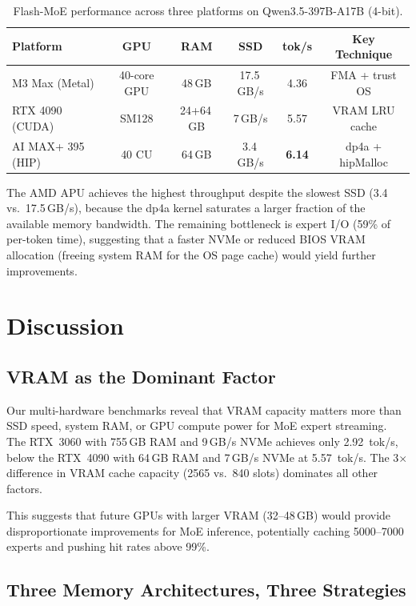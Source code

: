 \documentclass[10pt]{article}
\begin{document}
\begin{table}[h]
\centering
\small
\caption{Flash-MoE performance across three platforms on Qwen3.5-397B-A17B (4-bit).}
\label{tab:crossplatform}
\begin{tabular}{lccccc}
\toprule
\textbf{Platform} & \textbf{GPU} & \textbf{RAM} & \textbf{SSD} & \textbf{tok/s} & \textbf{Key Technique} \\
\midrule
M3 Max (Metal) & 40-core GPU & 48\,GB & 17.5\,GB/s & 4.36 & FMA + trust OS \\
RTX 4090 (CUDA) & SM128 & 24+64\,GB & 7\,GB/s & 5.57 & VRAM LRU cache \\
AI MAX+ 395 (HIP) & 40 CU & 64\,GB & 3.4\,GB/s & \textbf{6.14} & dp4a + hipMalloc \\
\bottomrule
\end{tabular}
\end{table}

The AMD APU achieves the highest throughput despite the slowest SSD (3.4 vs.\ 17.5\,GB/s), because the dp4a kernel saturates a larger fraction of the available memory bandwidth. The remaining bottleneck is expert I/O (59\% of per-token time), suggesting that a faster NVMe or reduced BIOS VRAM allocation (freeing system RAM for the OS page cache) would yield further improvements.

\section{Discussion}

\subsection{VRAM as the Dominant Factor}

Our multi-hardware benchmarks reveal that VRAM capacity matters more than SSD speed, system RAM, or GPU compute power for MoE expert streaming. The RTX~3060 with 755\,GB RAM and 9\,GB/s NVMe achieves only 2.92~tok/s, below the RTX~4090 with 64\,GB RAM and 7\,GB/s NVMe at 5.57~tok/s. The 3$\times$ difference in VRAM cache capacity (2565 vs.\ 840 slots) dominates all other factors.

This suggests that future GPUs with larger VRAM (32--48\,GB) would provide disproportionate improvements for MoE inference, potentially caching 5000--7000 experts and pushing hit rates above 99\%.

\subsection{Three Memory Architectures, Three Strategies}
\end{document}
